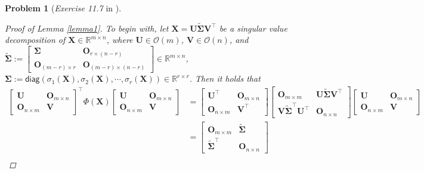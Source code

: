 \documentclass[11pt]{article}
\newtheorem{problem}{Problem}
\numberwithin{equation}{problem}
\begin{document}
\begin{problem} [\emph{Exercise 11.7} in \cite{calafiore2014optimization}]
{\begin{proof} [Proof of Lemma \ref{lemma1}]
To begin with, let $\mathbf{X} = \mathbf{U} \tilde{\mathbf{\Sigma}} \mathbf{V}^{\top}$ be a singular value decomposition of $\mathbf{X} \in \mathbb{R}^{m \times n}$, where $\mathbf{U} \in \mathcal{O}(m)$, $\mathbf{V} \in \mathcal{O}(n)$, and $\tilde{\mathbf{\Sigma}} := \begin{bmatrix} \mathbf{\Sigma} & \mathbf{O}_{r \times (n-r)} \\
\mathbf{O}_{(m-r) \times r} & \mathbf{O}_{(m-r) \times (n-r)} \end{bmatrix} \in \mathbb{R}^{m \times n}$, $\mathbf{\Sigma} := \textsf{diag} \left( \sigma_1 (\mathbf{X}), \sigma_2 (\mathbf{X}), \cdots, \sigma_r (\mathbf{X}) \right) \in \mathbb{R}^{r \times r}$. Then it holds that
\begin{equation}
    \label{eqn2.5}
    \begin{split}
        \begin{bmatrix} \mathbf{U} & \mathbf{O}_{m \times n} \\ \mathbf{O}_{n \times m} & \mathbf{V} \end{bmatrix}^{\top} \Phi (\mathbf{X}) \begin{bmatrix} \mathbf{U} & \mathbf{O}_{m \times n} \\ \mathbf{O}_{n \times m} & \mathbf{V} \end{bmatrix} 
        &= \begin{bmatrix} \mathbf{U}^{\top} & \mathbf{O}_{m \times n} \\ \mathbf{O}_{n \times m} & \mathbf{V}^{\top} \end{bmatrix}
        \begin{bmatrix}
        \mathbf{O}_{m \times m} & \mathbf{U} \tilde{\mathbf{\Sigma}} \mathbf{V}^{\top} \\ \mathbf{V} \tilde{\mathbf{\Sigma}}^{\top} \mathbf{U}^{\top} & \mathbf{O}_{n \times n}
        \end{bmatrix}
        \begin{bmatrix} \mathbf{U} & \mathbf{O}_{m \times n} \\ \mathbf{O}_{n \times m} & \mathbf{V} \end{bmatrix} \\
        &= \begin{bmatrix}
        \mathbf{O}_{m \times m} & \tilde{\mathbf{\Sigma}} \\ \tilde{\mathbf{\Sigma}}^{\top} & \mathbf{O}_{n \times n}
        \end{bmatrix} \\

\end{split}
\end{equation}
\end{proof}}
\end{problem}
\end{document}
